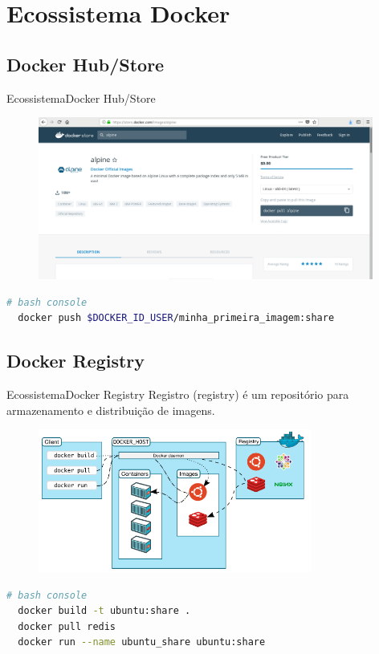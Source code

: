 \section{Ecossistema Docker}

\subsection{Docker Hub/Store}
\begin{frame}[fragile]{Ecossistema}{Docker Hub/Store}
  \begin{figure}[ht!]
    \centering
    \includegraphics[width=110mm]{images/hub_store.png}
  \end{figure}
  \begin{lstlisting}[language=bash]
  # bash console
  docker push $DOCKER_ID_USER/minha_primeira_imagem:share
  \end{lstlisting}
\end{frame}

\subsection{Docker Registry}
\begin{frame}[fragile]{Ecossistema}{Docker Registry}
  Registro (registry) é um repositório para armazenamento e distribuição de imagens.
  \begin{figure}[ht!]
    \centering
    \includegraphics[width=90mm]{images/architecture.png}
  \end{figure}
  \begin{lstlisting}[language=bash]
  # bash console
  docker build -t ubuntu:share .
  docker pull redis
  docker run --name ubuntu_share ubuntu:share
  \end{lstlisting}
\end{frame}

